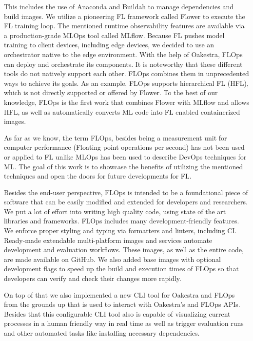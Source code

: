 This includes the use of Anaconda and Buildah to manage dependencies and build images.
We utilize a pioneering FL framework called Flower to execute the FL training loop.
The mentioned runtime observability features are available via a production-grade MLOps tool called MLflow.
Because FL pushes model training to client devices, including edge devices,
we decided to use an orchestrator native to the edge environment.
With the help of Oakestra, FLOps can deploy and orchestrate its components.
It is noteworthy that these different tools do not natively support each other.
FLOps combines them in unprecedented ways to achieve its goals.
As an example, FLOps supports hierarchical FL (HFL), which is not directly supported or offered by Flower.
To the best of our knowledge, FLOps is the first work that combines Flower with MLflow and allows HFL,
as well as automatically converts ML code into FL enabled containerized images.

As far as we know, the term FLOps, besides being a measurement unit for computer performance (Floating point operations per second)
has not been used or applied to FL unlike MLOps has been used to describe DevOps techniques for ML.
The goal of this work is to showcase the benefits of utilizing the mentioned techniques and
open the doors for future developments for FL.


Besides the end-user perspective, FLOps is intended to be a foundational piece of software
that can be easily modified and extended for developers and researchers.
We put a lot of effort into writing high quality code, using state of the art libraries and frameworks.
FLOps includes many development-friendly features.
We enforce proper styling and typing via formatters and linters, including CI.
Ready-made extendable multi-platform images and services automate development and evaluation workflows.
These images, as well as the entire code, are made available on GitHub.
We also added base images with optional development flags to speed up the build and execution times of FLOps
so that developers can verify and check their changes more rapidly.

On top of that we also implemented a new CLI tool for Oakestra and FLOps from the grounds up
that is used to interact with Oakestra's and FLOps APIs.
Besides that this configurable CLI tool also is capable of visualizing 
current processes in a human friendly way in real time as well as trigger evaluation runs and
other automated tasks like installing necessary dependencies.